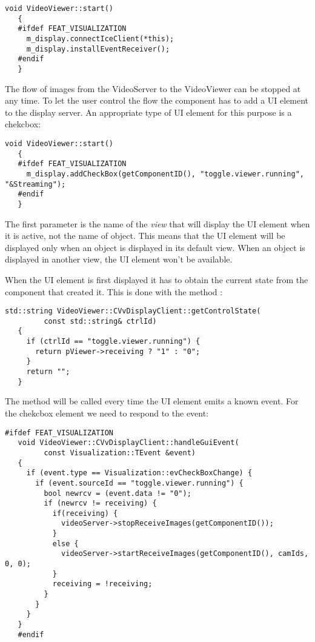 \begin{Verbatim}[fontsize=\scriptsize,gobble=3]
   void VideoViewer::start()
   {
   #ifdef FEAT_VISUALIZATION
     m_display.connectIceClient(*this);
     m_display.installEventReceiver();
   #endif
   }
\end{Verbatim}

The flow of images from the VideoServer to the VideoViewer can be stopped at
any time. To let the user control the flow the component has to add a UI
element to the display server.  An appropriate type of UI element for this
purpose is a chekcbox:

\begin{Verbatim}[fontsize=\scriptsize,gobble=3]
   void VideoViewer::start()
   {
   #ifdef FEAT_VISUALIZATION
     m_display.addCheckBox(getComponentID(), "toggle.viewer.running", "&Streaming");
   #endif
   }
\end{Verbatim}

The first parameter is the name of the {\em view} that will display the UI
element when it is active, not the name of object. This means that the UI
element will be displayed only when an object is displayed in its default view.
When an object is displayed in another view, the UI element won't be available.

When the UI element is first displayed it has to obtain the current state from
the component that created it. This is done with the method
:

\begin{Verbatim}[fontsize=\scriptsize,gobble=3]
   std::string VideoViewer::CVvDisplayClient::getControlState(
         const std::string& ctrlId)
   {
     if (ctrlId == "toggle.viewer.running") {
       return pViewer->receiving ? "1" : "0";
     }
     return "";
   }
\end{Verbatim}

The method  will be called every time the UI element
emits a known event. For the chekcbox element we need to respond to the
 event:

\begin{Verbatim}[fontsize=\scriptsize,gobble=3]
   #ifdef FEAT_VISUALIZATION
   void VideoViewer::CVvDisplayClient::handleGuiEvent(
         const Visualization::TEvent &event)
   {
     if (event.type == Visualization::evCheckBoxChange) {
       if (event.sourceId == "toggle.viewer.running") {
         bool newrcv = (event.data != "0");
         if (newrcv != receiving) {
           if(receiving) {
             videoServer->stopReceiveImages(getComponentID());
           }
           else {
             videoServer->startReceiveImages(getComponentID(), camIds, 0, 0);
           }
           receiving = !receiving;
         }
       }
     }
   }
   #endif
\end{Verbatim}

